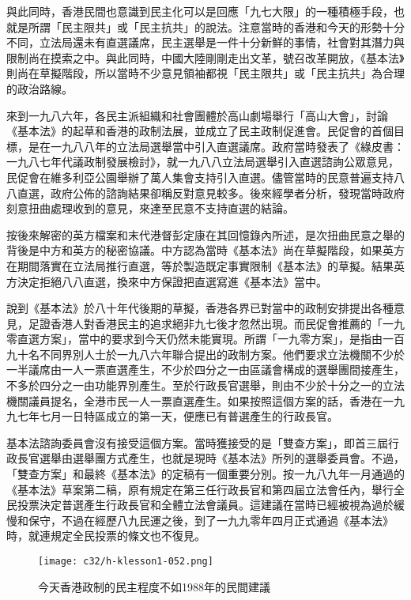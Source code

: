 與此同時，香港民間也意識到民主化可以是回應「九七大限」的一種積極手段，也就是所謂「民主限共」或「民主抗共」的說法。注意當時的香港和今天的形勢十分不同，立法局還未有直選議席，民主選舉是一件十分新鮮的事情，社會對其潛力與限制尚在摸索之中。與此同時，中國大陸剛剛走出文革，號召改革開放，《基本法》則尚在草擬階段，所以當時不少意見領袖都視「民主限共」或「民主抗共」為合理的政治路線。

來到一九八六年，各民主派組織和社會團體於高山劇場舉行「高山大會」，討論《基本法》的起草和香港的政制法展，並成立了民主政制促進會。民促會的首個目標，是在一九八八年的立法局選舉當中引入直選議席。政府當時發表了《綠皮書：一九八七年代議政制發展檢討》，就一九八八立法局選舉引入直選諮詢公眾意見，民促會在維多利亞公園舉辦了萬人集會支持引入直選。儘管當時的民意普遍支持八八直選，政府公佈的諮詢結果卻稱反對意見較多。後來經學者分析，發現當時政府刻意扭曲處理收到的意見，來達至民意不支持直選的結論。

按後來解密的英方檔案和末代港督彭定康在其回憶錄內所述，是次扭曲民意之舉的背後是中方和英方的秘密協議。中方認為當時《基本法》尚在草擬階段，如果英方在期間落實在立法局推行直選，等於製造既定事實限制《基本法》的草擬。結果英方決定拒絕八八直選，換來中方保證把直選寫進《基本法》當中。

說到《基本法》於八十年代後期的草擬，香港各界已對當中的政制安排提出各種意見，足證香港人對香港民主的追求絕非九七後才忽然出現。而民促會推薦的「一九零直選方案」，當中的要求到今天仍然未能實現。所謂「一九零方案」，是指由一百九十名不同界別人士於一九八六年聯合提出的政制方案。他們要求立法機關不少於一半議席由一人一票直選產生，不少於四分之一由區議會構成的選舉團間接產生，不多於四分之一由功能界別產生。至於行政長官選舉，則由不少於十分之一的立法機關議員提名，全港市民一人一票直選產生。如果按照這個方案的話，香港在一九九七年七月一日特區成立的第一天，便應已有普選產生的行政長官。

基本法諮詢委員會沒有接受這個方案。當時獲接受的是「雙查方案」，即首三屆行政長官選舉由選舉團方式產生，也就是現時《基本法》所列的選舉委員會。不過，「雙查方案」和最終《基本法》的定稿有一個重要分別。按一九八九年一月通過的《基本法》草案第二稿，原有規定在第三任行政長官和第四屆立法會任內，舉行全民投票決定普選產生行政長官和全體立法會議員。這建議在當時已經被視為過於緩慢和保守，不過在經歷八九民運之後，到了一九九零年四月正式通過《基本法》時，就連規定全民投票的條文也不復見。

\begin{figure}[htbp]
    \centering
    \texttt{[image: c32/h-klesson1-052.png]}
    \caption{今天香港政制的民主程度不如1988年的民間建議} 
\end{figure}

